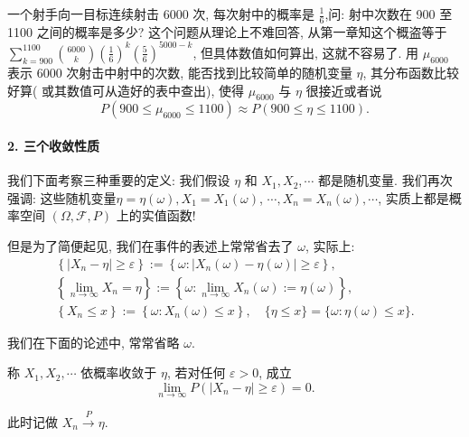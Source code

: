 \begin{example}
    一个射手向一目标连续射击 6000 次, 每次射中的概率是 $\frac{1}{6}$,问: 射中次数在 900 至 1100 之间的概率是多少? 这个问题从理论上不难回答, 从第一章知这个概盗等于 $\sum_{k=900}^{1100} {6000\choose k}\left(\frac{1}{6}\right)^k\left(\frac{5}{6}\right)^{5000-k}$, 但具体数值如何算出, 这就不容易了. 用 $\mu_{6000}$ 表示 6000 次射击中射中的次数, 能否找到比较简单的随机变量 $\eta$, 其分布函数比较好算( 或其数值可从造好的表中查出), 使得 $\mu_{6000}$ 与 $\eta$ 很接近或者说
$$
P\left(900 \leq \mu_{6000} \leq 1100\right) \approx P(900 \leq \eta \leq 1100) .
$$
\end{example}

\paragraph{2. 三个收敛性质} 我们下面考察三种重要的定义: 我们假设 $\eta$ 和 $X_1, X_2, \cdots$ 都是随机变量. 我们再次强调: 这些随机变量$\eta=\eta(\omega), X_1=X_1(\omega)$, $\cdots, X_n=X_n(\omega), \cdots$, 实质上都是概率空间 $(\Omega, \mathscr{F}, P)$ 上的实值函数!

但是为了简便起见, 我们在事件的表述上常常省去了 $\omega$, 实际上:
$$
\begin{gathered}
\left\{\left|X_n-\eta\right| \geqslant \varepsilon\right\}:=\left\{\omega:\left|X_n(\omega)-\eta(\omega)\right| \geqslant \varepsilon\right\}, \\
\left\{\lim _{n \rightarrow \infty} X_n=\eta\right\}:=\left\{\omega: \lim _{n \rightarrow \infty} X_n(\omega):=\eta(\omega)\right\}, \\
\left\{X_n \leq x\right\}:=\left\{\omega: X_n(\omega) \leq x\right\}, \quad\{\eta \leq x\}=\{\omega: \eta(\omega) \leq x\} .
\end{gathered}
$$

我们在下面的论述中, 常常省略 $\omega$.

\begin{center}
\end{center}

\begin{definition}
    称 $X_1, X_2, \cdots$ 依概率收敛于 $\eta$, 若对任何 $\varepsilon>0$, 成立
$$
\lim _{n \rightarrow \infty} P\left(\left|X_n-\eta\right| \geqslant \varepsilon\right)=0 .
$$

此时记做 $X_n \stackrel{P}{\longrightarrow} \eta$.
\end{definition}

